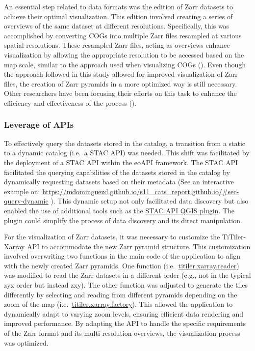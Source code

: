 \documentclass[
  oneside,
  open=any]{scrbook}
\begin{document}
An essential step related to data formats was the edition of Zarr
datasets to achieve their optimal visualization. This edition involved
creating a series of overviews of the same dataset at different
resolutions. Specifically, this was accomplished by converting COGs into
multiple Zarr files resampled at various spatial resolutions. These
resampled Zarr files, acting as overviews enhance visualization by
allowing the appropriate resolution to be accessed based on the map
scale, similar to the approach used when visualizing COGs
(). Even though the
approach followed in this study allowed for improved visualization of
Zarr files, the creation of Zarr pyramids in a more optimized way is
still necessary. Other researchers have been focusing their efforts on
this task to enhance the efficiency and effectiveness of the process
().

\subsubsection*{Leverage of APIs}\label{leverage-of-apis}

To effectively query the datasets stored in the catalog, a transition
from a static to a dynamic catalog (i.e.~a STAC API) was needed. This
shift was facilitated by the deployment of a STAC API within the eoAPI
framework. The STAC API facilitated the querying capabilities of the
datasets stored in the catalog by dynamically requesting datasets based
on their metadata (See an interactive example on:
{\url{https://mdominguezd.github.io/s11_cats_report.github.io/\#sec-query-dynamic}}
). This dynamic setup not only facilitated data discovery but also
enabled the use of additional tools such as the
\href{https://plugins.qgis.org/plugins/qgis_stac/}{STAC API QGIS
plugin}. The plugin could simplify the process of data discovery and its
direct manipulation.

For the visualization of Zarr datasets, it was necessary to customize
the TiTiler-Xarray API to accommodate the new Zarr pyramid structure.
This customization involved overwriting two functions in the main code
of the application to align with the newly created Zarr pyramids. One
function
(i.e.~\href{https://github.com/developmentseed/titiler-xarray/blob/dev/titiler/xarray/reader.py}{titiler.xarray.reader})
was modified to read the Zarr datasets in a different order (e.g., not
in the typical zyx order but instead zxy). The other function was
adjusted to generate the tiles differently by selecting and reading from
different pyramids depending on the zoom of the map
(i.e.~\href{https://github.com/developmentseed/titiler-xarray/blob/dev/titiler/xarray/factory.py}{titiler.xarray.factory}).
This allowed the application to dynamically adapt to varying zoom
levels, ensuring efficient data rendering and improved performance. By
adapting the API to handle the specific requirements of the Zarr format
and its multi-resolution overviews, the visualization process was
optimized.
\end{document}
